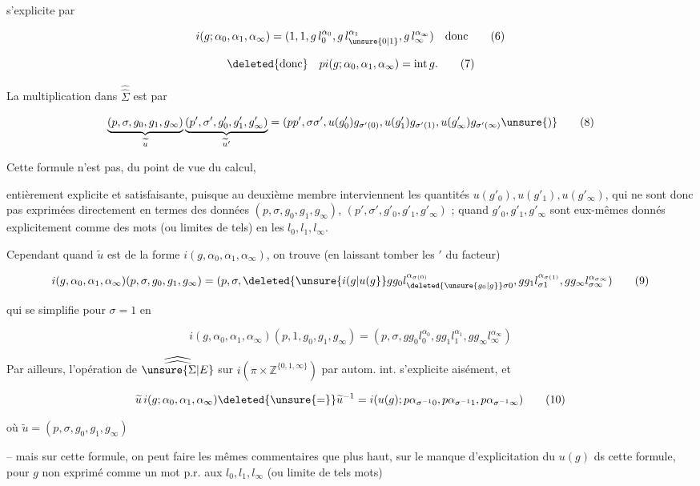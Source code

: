 s'explicite par


\[
i(g;\alpha_0,\alpha_1,\alpha_\infty)=(1,1,g\,l_0^{\alpha_0},g\,l_{\unsure{0|1}}^{\alpha_1},g\,l_\infty^{\alpha_\infty})\quad\text{donc} \tag*{(6)}
\]

\[
\deleted{\text{donc}}\quad pi(g;\alpha_0,\alpha_1,\alpha_\infty)=\mathrm{int}\,g. \tag*{(7)}
\]

La multiplication dans $\widehat{\widehat\Sigma}$ est  par

\[
\underbrace{(p,\sigma,g_0,g_1,g_\infty)}_{\widetilde u}
\underbrace{(p',\sigma',g'_0,g'_1,g'_\infty)}_{\widetilde u'}
=(pp',\sigma\sigma',u(g'_0)g_{\sigma'(0)},u(g'_1)g_{\sigma'(1)},u(g'_\infty)g_{\sigma'(\infty)}\unsure{)} \tag*{(8)}
\]

Cette formule n'est pas, du point de vue du calcul,

entièrement explicite et satisfaisante, puisque au deuxième membre interviennent les quantités $u(g'_0),u(g'_1),u(g'_\infty)$, qui ne sont donc pas exprimées directement en termes des  données $(p,\sigma,g_0,g_1,g_\infty)$, $(p',\sigma',g'_0,g'_1,g'_\infty)$ ;   quand $g'_0,g'_1,g'_\infty$ sont eux-mêmes donnés explicitement comme des mots (ou limites de tels) en les $l_0,l_1,l_\infty$.

Cependant quand $\widetilde u$ est de la forme $i(g,\alpha_0,\alpha_1,\alpha_\infty)$, on trouve (en laissant tomber les $'$ du  facteur)

\[
 i(g,\alpha_0,\alpha_1,\alpha_\infty)(p,\sigma,g_0,g_1,g_\infty)=(p,\sigma,\deleted{\unsure{i(g|u(g}}gg_0l_{\deleted{\unsure{g_0|g}}\sigma0}^{\alpha_{\sigma(0)}},gg_1l_{\sigma1}^{\alpha_{\sigma(1)}},gg_\infty l_{\sigma\infty}^{\alpha_{\sigma\infty}})\tag*{(9)}
\]

qui se simplifie pour $\sigma=1$ en

\[
 i(g,\alpha_0,\alpha_1,\alpha_\infty)(p,1,g_0,g_1,g_\infty)=(p,\sigma,gg_0l_0^{\alpha_0},gg_1l_1^{\alpha_1},gg_\infty l_\infty^{\alpha_\infty})\tag*{($9'$)}
\]

Par ailleurs, l'opération de $\widehat{\widehat{\unsure{\Sigma|E}}}$ sur $i(\pi\times\mathbb Z^{\{0,1,\infty\}})$ par autom. int. s'explicite aisément, et 

\[
 \widetilde u\,i(g;\alpha_0,\alpha_1,\alpha_\infty)\deleted{\unsure{=}}\widetilde u^{-1}=i(u(g);p\alpha_{\sigma^{-1}0},p\alpha_{\sigma^{-1}1},p\alpha_{\sigma^{-1}\infty})\tag*{(10)}
\]

où $\widetilde u=(p,\sigma,g_0,g_1,g_\infty)$

-- mais sur cette formule, on peut faire les mêmes commentaires que plus haut, sur le manque d'explicitation du  $u(g)$ ds cette formule, pour $g$ non exprimé comme un mot p.r. aux $l_0,l_1,l_\infty$ (ou limite de tels mots)

